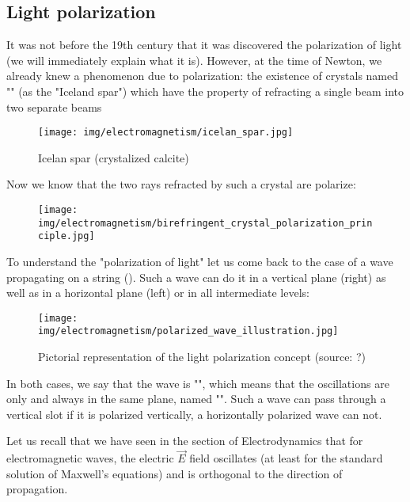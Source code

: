 	\subsection{Light polarization}\label{light polarization}
	It was not before the 19th century that it was discovered the polarization of light (we will immediately explain what it is). However, at the time of Newton, we already knew a phenomenon due to polarization: the existence of crystals named "" (as the "Iceland spar") which have the property of refracting a single beam into two separate beams
	\begin{figure}[H]
		\centering
		\texttt{[image: img/electromagnetism/icelan\_spar.jpg]}
		\caption{Icelan spar (crystalized calcite)}
	\end{figure}
	Now we know that the two rays refracted by such a crystal are polarize:
	\begin{figure}[H]
		\centering
		\texttt{[image: img/electromagnetism/birefringent\_crystal\_polarization\_principle.jpg]}
	\end{figure}
	To understand the "polarization of light" let us come back to the case of a wave propagating on a string (). Such a wave can do it in a vertical plane (right) as well as in a horizontal plane (left) or in all intermediate levels:
	\begin{figure}[H]
		\centering
		\texttt{[image: img/electromagnetism/polarized\_wave\_illustration.jpg]}
		\caption[Pictorial representation of the light polarization concept]{Pictorial representation of the light polarization concept (source: ?)}
	\end{figure}
	In both cases, we say that the wave is "", which means that the oscillations are only and always in the same plane, named "". Such a wave can pass through a vertical slot if it is polarized vertically, a horizontally polarized wave can not.

	Let us recall that we have seen in the section of Electrodynamics that for electromagnetic waves, the electric $\vec{E}$ field oscillates (at least for the standard solution of Maxwell's equations) and is orthogonal to the direction of propagation.
	
